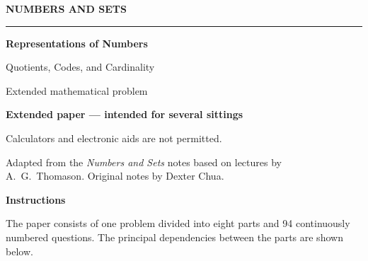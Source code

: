 \documentclass[10pt,a4paper]{article}
\begin{document}

\begin{titlepage}
  \thispagestyle{empty}
  \begin{center}
    \vspace*{1.3cm}
    {\Large\bfseries NUMBERS AND SETS\par}
    \vspace{0.35cm}
    \rule{0.72\textwidth}{0.6pt}
    \vspace{0.65cm}

    {\huge\bfseries Representations of Numbers\par}
    \vspace{0.2cm}
    {\Large Quotients, Codes, and Cardinality\par}

    \vfill

    {\Large Extended mathematical problem\par}

    \vfill

    \begin{minipage}{0.72\textwidth}
      \centering
      \textbf{Extended paper --- intended for several sittings}\par
      \vspace{0.25cm}
      Calculators and electronic aids are not permitted.
    \end{minipage}

    \vfill

    \begin{minipage}{0.82\textwidth}
      \centering\small
      Adapted from the \emph{Numbers and Sets} notes based on lectures by
      A.\ G.\ Thomason. Original notes by Dexter Chua.
    \end{minipage}
    \vspace*{0.8cm}
  \end{center}
\end{titlepage}


\begin{center}
  {\large\bfseries Instructions}
\end{center}

The paper consists of one problem divided into eight parts and
94 continuously numbered questions.
The principal dependencies between the parts are shown below.

\begin{center}
\end{center}
\end{document}
